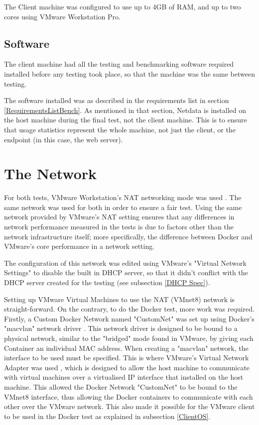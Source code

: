 The Client machine was configured to use up to 4GB of RAM, and up to two cores using VMware Workstation Pro.

\subsection{Software}
The client machine had all the testing and benchmarking software required installed before any testing took place, so that the machine was the same between testing.

The software installed was as described in the requirements list in section \ref{RequirementsListBench}. As mentioned in that section, Netdata is installed on the host machine during the final test, not the client machine. This is to ensure that usage statistics represent the whole machine, not just the client, or the endpoint (in this case, the web server).

\section{The Network}
For both tests, VMware Workstation's NAT networking mode was used \citep{VMwareNAT}. The same network was used for both in order to ensure a fair test. Using the same network provided by VMware's NAT setting ensures that any differences in network performance measured in the tests is due to factors other than the network infrastructure itself; more specifically, the difference between Docker and VMware's core performance in a network setting.

The configuration of this network was edited using VMware's "Virtual Network Settings" \citep{VMwareNetChange} to disable the built in DHCP server, so that it didn't conflict with the DHCP server created for the testing (see subsection \ref{DHCP Spec}).

Setting up VMware Virtual Machines to use the NAT (VMnet8) network is straight-forward. On the contrary, to do the Docker test, more work was required. Firstly, a Custom Docker Network named "CustomNet" was set up using Docker's "macvlan" network driver \citep{DockerMacVlan}. This network driver is designed to be bound to a physical network, similar to the "bridged" mode found in VMware, by giving each Container an individual MAC address. When creating a "macvlan" network, the interface to be used must be specified. This is where VMware's Virtual Network Adapter was used \citep{VMwareNetworkAdapter}, which is designed to allow the host machine to communicate with virtual machines over a virtualised IP interface that installed on the host machine. This allowed the Docker Network "CustomNet" to be bound to the VMnet8 interface, thus allowing the Docker containers to communicate with each other over the VMware network. This also made it possible for the VMware client to be used in the Docker test as explained in subsection \ref{ClientOS}.

